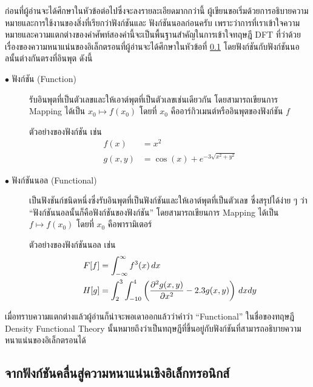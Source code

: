 ก่อนที่ผู้อ่านจะได้ศึกษาในหัวข้อต่อไปซึ่งจะลงรายละเอียดมากกว่านี้ ผู้เขียนขอเริ่มด้วยการอธิบายความหมายและการใช้งานของสิ่งที่เรียกว่าฟังก์ชันและ%
ฟังก์ชันนอลก่อนครับ เพราะว่าการที่เราเข้าใจความหมายและความแตกต่างของคำศัพท์สองคำนี้จะเป็นพื้นฐานสำคัญในการเข้าใจทฤษฎี DFT ที่ว่าด้วย%
เรื่องของความหนาแน่นของอิเล็กตรอนที่ผู้อ่านจะได้ศึกษาในหัวข้อที่ \ref{ssec:elec_density} โดยฟังก์ชันกับฟังก์ชันนอลนั้นต่างกันตรงที่อินพุต 
ดังนี้

\begin{description}
    \item[$\bullet$ ฟังก์ชัน (Function)] รับอินพุตที่เป็นตัวเลขและให้เอาต์พุตที่เป็นตัวเลขเช่นเดียวกัน โดยสามารถเขียนการ Mapping 
    ได้เป็น $x_0 \mapsto f(x_0)$ โดยที่ $x_{0}$ คืออาร์กิวเมนต์หรืออินพุตของฟังก์ชัน $f$ 
    
    ตัวอย่างของฟังก์ชัน เช่น
    \begin{align*}
        f(x) &= x^{2} \\
        g(x,y) &= \cos(x) + e^{-3\sqrt{x^{2} + y^{2}}}
    \end{align*}

    \item[$\bullet$ ฟังก์ชันนอล (Functional)] เป็นฟังชันก์ชนิดหนึ่งซึ่งรับอินพุตที่เป็นฟังก์ชันและให้เอาต์พุตที่เป็นตัวเลข ซึ่งสรุปได้ง่าย ๆ 
    ว่า \enquote{ฟังก์ชันนอลนั้นก็คือฟังก์ชันของฟังก์ชัน} โดยสามารถเขียนการ Mapping ได้เป็น $f \mapsto f(x_0)$ โดยที่ $x_{0}$ 
    คือพารามิเตอร์ 
    
    ตัวอย่างของฟังก์ชันนอล เช่น 
    \begin{align*}
        F[f] &= \int^{\infty}_{-\infty} f^{3}(x) \, dx \\
        H[g] &= \int^{3}_{2} \int^{4}_{-10} \left ( \pdv[2]{g(x,y)}{x} - 2.3 g(x,y) \right ) \, dx dy
    \end{align*}
\end{description}

เมื่อทราบความแตกต่างแล้วผู้อ่านก็น่าจะพอเดาออกแล้วว่าคำว่า \enquote{Functional} ในชื่อของทฤษฎี Density Functional Theory 
นั้นหมายถึงว่าเป็นทฤษฎีที่ขึ้นอยู่กับฟังก์ชันที่สามารถอธิบายความหนาแน่นของอิเล็กตรอนได้

\subsection{จากฟังก์ชันคลื่นสู่ความหนาแน่นเชิงอิเล็กทรอนิกส์}
\label{ssec:elec_density}

